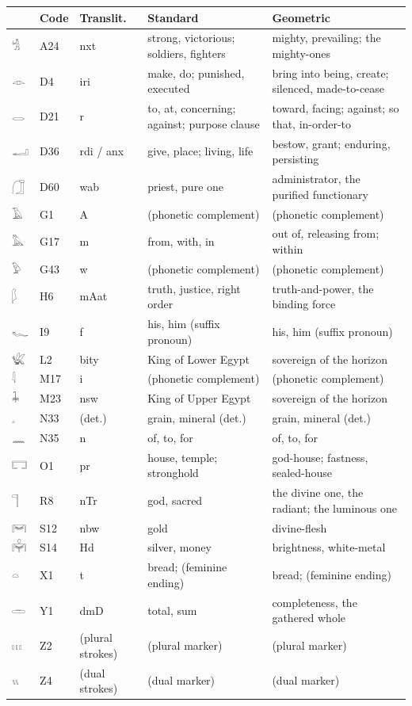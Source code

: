 \documentclass[11pt, a4paper]{article}
\newcommand{\hiero}[1]{{\normalfont\hierofont #1}}
\begin{document}
\footnotesize
\begin{longtable}{@{}lllp{1.1in}p{1.1in}@{}}
\toprule
 & \textbf{Code} & \textbf{Translit.} & \textbf{Standard} & \textbf{Geometric} \\
\midrule
\endhead
\hiero{𓀜} & A24 & nxt & strong, victorious; soldiers, fighters & mighty, prevailing; the mighty-ones \\
\hiero{𓁹} & D4 & iri & make, do; punished, executed & bring into being, create; silenced, made-to-cease \\
\hiero{𓂋} & D21 & r & to, at, concerning; against; purpose clause & toward, facing; against; so that, in-order-to \\
\hiero{𓂝} & D36 & rdi / anx & give, place; living, life & bestow, grant; enduring, persisting \\
\hiero{𓃂} & D60 & wab & priest, pure one & administrator, the purified functionary \\
\hiero{𓄿} & G1 & A & (phonetic complement) & (phonetic complement) \\
\hiero{𓅓} & G17 & m & from, with, in & out of, releasing from; within \\
\hiero{𓅱} & G43 & w & (phonetic complement) & (phonetic complement) \\
\hiero{𓆄} & H6 & mAat & truth, justice, right order & truth-and-power, the binding force \\
\hiero{𓆑} & I9 & f & his, him (suffix pronoun) & his, him (suffix pronoun) \\
\hiero{𓆤} & L2 & bity & King of Lower Egypt & sovereign of the horizon \\
\hiero{𓇋} & M17 & i & (phonetic complement) & (phonetic complement) \\
\hiero{𓇓} & M23 & nsw & King of Upper Egypt & sovereign of the horizon \\
\hiero{𓈒} & N33 & (det.) & grain, mineral (det.) & grain, mineral (det.) \\
\hiero{𓈖} & N35 & n & of, to, for & of, to, for \\
\hiero{𓉐} & O1 & pr & house, temple; stronghold & god-house; fastness, sealed-house \\
\hiero{𓊹} & R8 & nTr & god, sacred & the divine one, the radiant; the luminous one \\
\hiero{𓋞} & S12 & nbw & gold & divine-flesh \\
\hiero{𓋠} & S14 & Hd & silver, money & brightness, white-metal \\
\hiero{𓏏} & X1 & t & bread; (feminine ending) & bread; (feminine ending) \\
\hiero{𓏛} & Y1 & dmD & total, sum & completeness, the gathered whole \\
\hiero{𓏥} & Z2 & (plural strokes) & (plural marker) & (plural marker) \\
\hiero{𓏭} & Z4 & (dual strokes) & (dual marker) & (dual marker) \\
\bottomrule
\end{longtable}
\end{document}
